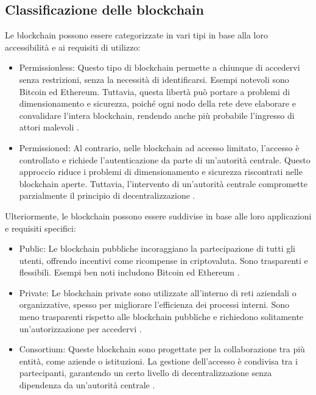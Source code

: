 \subsection{Classificazione delle blockchain}\label{subsec:classificazione}
Le blockchain possono essere categorizzate in vari tipi in base alla loro accessibilità e ai requisiti di utilizzo:

\begin{itemize}
    \item Permissionless: Questo tipo di blockchain permette a chiunque di accedervi senza restrizioni, senza la necessità di 
        identificarsi. Esempi notevoli sono Bitcoin ed Ethereum. Tuttavia, questa libertà può portare a problemi di dimensionamento 
        e sicurezza, poiché ogni nodo della rete deve elaborare e convalidare l’intera blockchain, rendendo anche più probabile 
        l’ingresso di attori malevoli \cite{permission}.

    \item Permissioned: Al contrario, nelle blockchain ad accesso limitato, l’accesso è controllato e richiede l’autenticazione 
        da parte di un’autorità centrale. Questo approccio riduce i problemi di dimensionamento e sicurezza riscontrati nelle 
        blockchain aperte. Tuttavia, l’intervento di un’autorità centrale compromette parzialmente il principio di decentralizzazione
        \cite{permission}.
\end{itemize}

Ulteriormente, le blockchain possono essere suddivise in base alle loro applicazioni e requisiti specifici:

\begin{itemize}
    \item Public: Le blockchain pubbliche incoraggiano la partecipazione di tutti gli utenti, offrendo incentivi come ricompense 
        in criptovaluta. Sono trasparenti e flessibili. Esempi ben noti includono Bitcoin ed Ethereum \cite{toshendra}.

    \item Private: Le blockchain private sono utilizzate all’interno di reti aziendali o organizzative, spesso per migliorare 
        l’efficienza dei processi interni. Sono meno trasparenti rispetto alle blockchain pubbliche e richiedono solitamente 
        un’autorizzazione per accedervi \cite{toshendra}.

    \item Consortium: Queste blockchain sono progettate per la collaborazione tra più entità, come aziende o istituzioni. La 
        gestione dell’accesso è condivisa tra i partecipanti, garantendo un certo livello di decentralizzazione senza dipendenza 
        da un’autorità centrale \cite{toshendra}.
\end{itemize}

